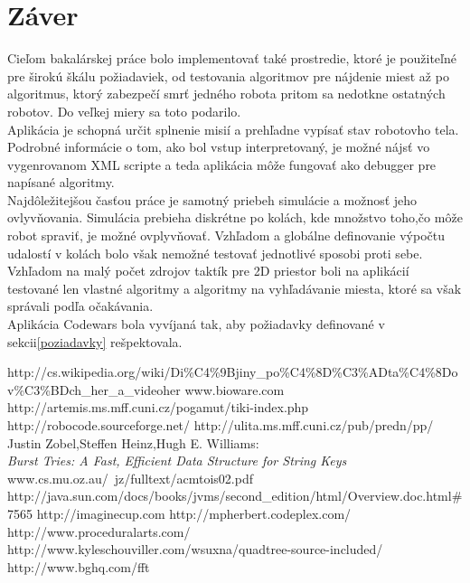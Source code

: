 \documentclass[12pt,a4paper,notitlepage]{report}
\begin{document}
\chapter{Záver}
Cieľom bakalárskej práce bolo implementovať také prostredie, ktoré je použiteľné pre širokú škálu požiadaviek, od testovania algoritmov pre nájdenie miest až po algoritmus, ktorý zabezpečí smrť jedného robota pritom sa nedotkne ostatných robotov. Do veľkej miery sa toto podarilo. \\
Aplikácia je schopná určit splnenie misií a prehľadne vypísať stav robotovho tela. Podrobné informácie o tom, ako bol vstup interpretovaný, je možné nájsť vo vygenrovanom XML scripte a teda aplikácia môže fungovať ako debugger pre napísané algoritmy.\\
Najdôležitejšou časťou práce je samotný priebeh simulácie a možnosť jeho ovlyvňovania. Simulácia prebieha diskrétne po kolách, kde množstvo toho,čo môže robot spraviť, je možné ovplyvňovať. Vzhľadom a globálne definovanie výpočtu udalostí v kolách bolo však nemožné testovať jednotlivé sposobi proti sebe.
Vzhľadom na malý počet zdrojov taktík pre 2D priestor boli na aplikácií testované len vlastné algoritmy a algoritmy na vyhľadávanie miesta, ktoré sa však správali podľa očakávania.\\
Aplikácia Codewars bola vyvíjaná tak, aby požiadavky definované v sekcii\ref{poziadavky} rešpektovala.

\newpage
{}
\begin{thebibliography}{99}
http://cs.wikipedia.org/wiki/Di\%C4\%9Bjiny\_po\%C4\%8D\%C3\%ADta\%C4\%8Dov\%C3\%BDch\_her\_a\_videoher
www.bioware.com
http://artemis.ms.mff.cuni.cz/pogamut/tiki-index.php
 http://robocode.sourceforge.net/
 http://ulita.ms.mff.cuni.cz/pub/predn/pp/
Justin Zobel,Steffen Heinz,Hugh E. Williams:\\
{\it Burst Tries: A Fast, Efficient Data Structure for String Keys} www.cs.mu.oz.au/~jz/fulltext/acmtois02.pdf
http://java.sun.com/docs/books/jvms/second\_edition/html/Overview.doc.html\#7565
http://imaginecup.com
http://mpherbert.codeplex.com/
http://www.proceduralarts.com/
http://www.kyleschouviller.com/wsuxna/quadtree-source-included/
http://www.bghq.com/fft 
\end{thebibliography}
\end{document}
